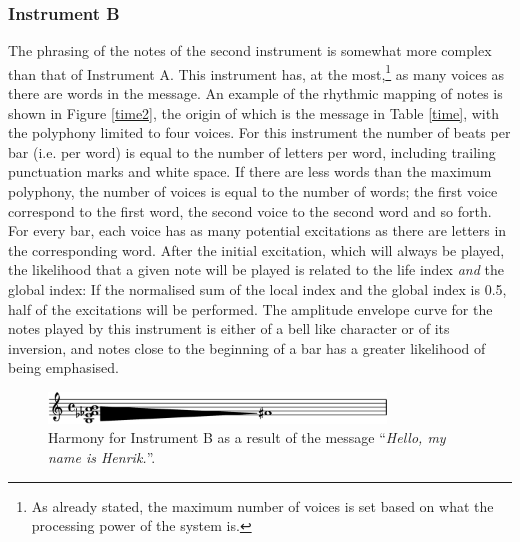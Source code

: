 \subsubsection{Instrument B}
The phrasing of the notes of the second instrument is somewhat more complex than that of Instrument A. This instrument has, at the most,\footnote{As already stated, the maximum number of voices is set based on what the   processing power of the system is.} as many voices as there are words in the message. An example of the rhythmic mapping of notes is shown in Figure \ref{time2}, the origin of which is the message in Table \ref{time}, with the polyphony limited to four voices. For this instrument the number of beats per bar (i.e. per word) is equal to the number of letters per word, including trailing punctuation marks and white space. If there are less words than the maximum polyphony, the number of voices is equal to the number of words; the first voice correspond to the first word, the second voice to the second word and so forth. For every bar, each voice has as many potential excitations as there are letters in the corresponding word. After the initial excitation, which will always be played, the likelihood that a given note will be played is related to the life index \emph{and} the global index: If the normalised sum of the local index and the global index is 0.5, half of the excitations will be performed. The amplitude envelope curve for the notes played by this instrument is either of a bell like character or of its inversion, and notes close to the beginning of a bar has a greater likelihood of being emphasised. 

\begin{figure}[!htb]
\begin{center}
\includegraphics[width=0.8\textwidth]{img/ethsnd/chord}
\caption{Harmony for Instrument B as a result of the message
  ``\emph{Hello, my name is Henrik.}''.} \label{chord}
\end{center}
\end{figure}

